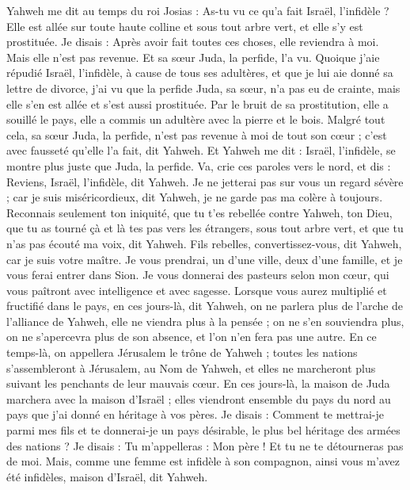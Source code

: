 \begin{multicols}{2}
Yahweh me dit au temps du roi Josias : As-tu vu ce qu’a fait Israël, l’infidèle ? Elle est allée sur toute haute colline et sous tout arbre vert, et elle s'y est prostituée.
Je disais : Après avoir fait toutes ces choses, elle reviendra à moi. Mais elle n'est pas revenue. Et sa sœur Juda, la perfide, l’a vu.
Quoique j’aie répudié Israël, l’infidèle, à cause de tous ses adultères, et que je lui aie donné sa lettre de divorce, j’ai vu que la perfide Juda, sa sœur, n'a pas eu de crainte, mais elle s'en est allée et s'est aussi prostituée.
Par le bruit de sa prostitution, elle a souillé le pays, elle a commis un adultère avec la pierre et le bois.
Malgré tout cela, sa sœur Juda, la perfide, n'est pas revenue à moi de tout son cœur ; c’est avec fausseté qu’elle l’a fait, dit Yahweh.
Et Yahweh me dit : Israël, l’infidèle, se montre plus juste que Juda, la perfide.
Va, crie ces paroles vers le nord, et dis : Reviens, Israël, l’infidèle, dit Yahweh. Je ne jetterai pas sur vous un regard sévère ; car je suis miséricordieux, dit Yahweh, je ne garde pas ma colère à toujours.
Reconnais seulement ton iniquité, que tu t’es rebellée contre Yahweh, ton Dieu, que tu as tourné çà et là tes pas vers les étrangers, sous tout arbre vert, et que tu n'as pas écouté ma voix, dit Yahweh.
Fils rebelles, convertissez-vous, dit Yahweh, car je suis votre maître. Je vous prendrai, un d'une ville, deux d'une famille, et je vous ferai entrer dans Sion.
Je vous donnerai des pasteurs selon mon cœur, qui vous paîtront avec intelligence et avec sagesse.
Lorsque vous aurez multiplié et fructifié dans le pays, en ces jours-là, dit Yahweh, on ne parlera plus de l'arche de l'alliance de Yahweh, elle ne viendra plus à la pensée ; on ne s’en souviendra plus, on ne s’apercevra plus de son absence, et l’on n’en fera pas une autre.
En ce temps-là, on appellera Jérusalem le trône de Yahweh ; toutes les nations s'assembleront à Jérusalem, au Nom de Yahweh, et elles ne marcheront plus suivant les penchants de leur mauvais cœur.
En ces jours-là, la maison de Juda marchera avec la maison d'Israël ; elles viendront ensemble du pays du nord au pays que j'ai donné en héritage à vos pères.
Je disais : Comment te mettrai-je parmi mes fils et te donnerai-je un pays désirable, le plus bel héritage des armées des nations ? Je disais : Tu m’appelleras : Mon père ! Et tu ne te détourneras pas de moi.
Mais, comme une femme est infidèle à son compagnon, ainsi vous m’avez été infidèles, maison d'Israël, dit Yahweh.

\end{multicols}
